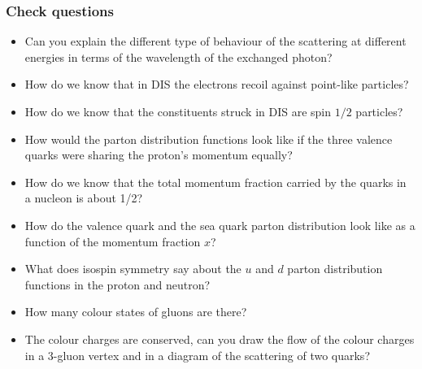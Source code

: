 \documentclass[12pt]{article}
\begin{document}
    \subsubsection{Check questions}
  \begin{itemize}
\item Can you explain the different type of behaviour of the scattering at different energies in  terms of the wavelength of the exchanged photon?
\item How do we know that in DIS the electrons recoil against point-like particles?
\item How do we know that the constituents struck in DIS are spin $1/2$ particles?
\item How would the parton distribution functions look like if the three valence quarks were sharing the proton's momentum equally?
\item How do we know that the total momentum fraction carried by the quarks in a nucleon is about 1/2?
\item How do the valence quark and the sea quark parton distribution look like as a function of the momentum fraction $x$?
\item What does isospin symmetry say about the $u$ and $d$ parton distribution functions in the proton and neutron?
\item How many colour states of gluons are there?
  \item The colour charges are conserved, can you draw the flow of the colour charges in a 3-gluon vertex and in a diagram of the scattering of two quarks?
  \end{itemize}
\end{document}
